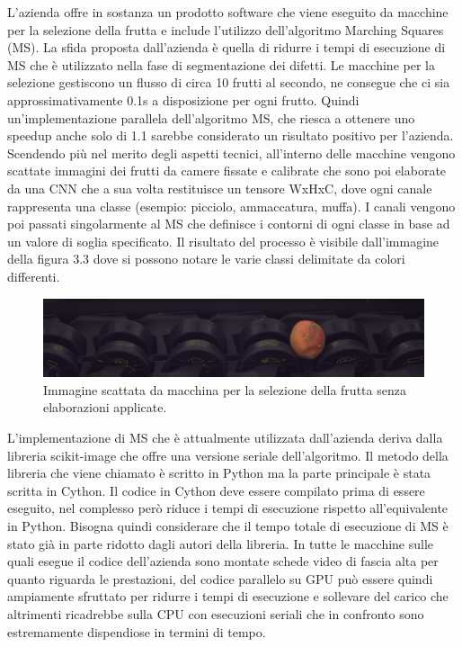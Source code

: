 \documentclass[12pt,a4paper]{report}
\begin{document}
L'azienda offre in sostanza un prodotto software che viene eseguito da macchine per la selezione della frutta e include l’utilizzo dell’algoritmo Marching Squares (MS). La sfida proposta dall’azienda è quella di ridurre i tempi di esecuzione di MS che è utilizzato nella fase di segmentazione dei difetti.
Le macchine per la selezione gestiscono un flusso di circa 10 frutti al secondo, ne consegue che ci sia approssimativamente 0.1s a disposizione per ogni frutto. Quindi un’implementazione parallela dell’algoritmo MS, che riesca a ottenere uno speedup anche solo di 1.1 sarebbe considerato un risultato positivo per l’azienda.
Scendendo più nel merito degli aspetti tecnici, all’interno delle macchine vengono scattate immagini dei frutti da camere fissate e calibrate che sono poi elaborate da una CNN che a sua volta restituisce un tensore WxHxC, dove ogni canale rappresenta una classe (esempio: picciolo, ammaccatura, muffa). I canali vengono poi passati singolarmente al MS che definisce i contorni di ogni classe in base ad un valore di soglia specificato. Il risultato del processo è visibile dall’immagine della figura 3.3 dove si possono notare le varie classi delimitate da colori differenti.

\begin{figure}[H]
    \centering
    \includegraphics[scale=0.25]{img/marching_squares_00000052_00000001.png}
    \caption{Immagine scattata da macchina per la selezione della frutta senza elaborazioni applicate.}
\end{figure}

L’implementazione di MS che è attualmente utilizzata dall’azienda deriva dalla libreria scikit-image che offre una versione seriale dell’algoritmo. Il metodo della libreria che viene chiamato è scritto in Python ma la parte principale è stata scritta in Cython.
Il codice in Cython deve essere compilato prima di essere eseguito, nel complesso però riduce i tempi di esecuzione rispetto all’equivalente in Python. Bisogna quindi considerare che il tempo totale di esecuzione di MS è stato già in parte ridotto dagli autori della libreria. \newline
In tutte le macchine sulle quali esegue il codice dell'azienda sono montate schede video di fascia alta per quanto riguarda le prestazioni, del codice parallelo su GPU può essere quindi ampiamente sfruttato per ridurre i tempi di esecuzione e sollevare del carico che altrimenti ricadrebbe sulla CPU con esecuzioni seriali che in confronto sono estremamente dispendiose in termini di tempo.
\end{document}
